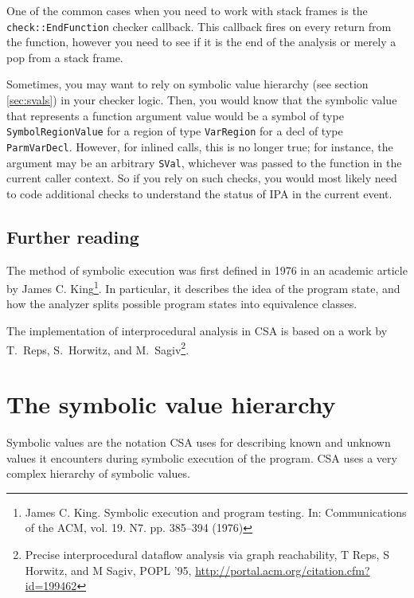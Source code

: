 \documentclass[a4paper,12pt]{article}
\begin{document}
One of the common cases when you need to work with stack frames is the \lstinline|check::EndFunction| checker callback. This callback fires on every return from the function, however you need to see if it is the end of the analysis or merely a pop from a stack frame.

Sometimes, you may want to rely on symbolic value hierarchy (see section \ref{sec:svals}) in your checker logic. Then, you would know that the symbolic value that represents a function argument value would be a symbol of type \lstinline|SymbolRegionValue| for a region of type \lstinline|VarRegion| for a decl of type \lstinline|ParmVarDecl|. However, for inlined calls, this is no longer true; for instance, the argument may be an arbitrary \lstinline|SVal|, whichever was passed to the function in the current caller context. So if you rely on such checks, you would most likely need to code additional checks to understand the status of IPA in the current event.

\subsection{Further reading}

The method of symbolic execution was first defined in 1976 in an academic article by James C. King\footnote{James C. King. Symbolic execution and program testing. In: Communications of the ACM, vol. 19. N7. pp. 385--394 (1976)}. In particular, it describes the idea of the program state, and how the analyzer splits possible program states into equivalence classes.

The implementation of interprocedural analysis in CSA is based on a work by T.~Reps, S.~Horwitz, and M.~Sagiv\footnote{Precise interprocedural dataflow analysis via graph reachability, T Reps, S Horwitz, and M Sagiv, POPL '95,     \url{http://portal.acm.org/citation.cfm?id=199462}}.

\newpage
\section{The symbolic value hierarchy}\label{sec:svals}

Symbolic values are the notation CSA uses for describing known and unknown values it encounters during symbolic execution of the program. CSA uses a very complex hierarchy of symbolic values.
\end{document}
